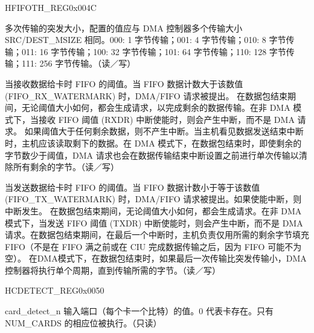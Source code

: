 \begin{register}{H}{FIFOTH\_REG}{0x004C}\label{regdesc:FIFOTHREG}
%
%
%
%
%
%
\regnewline%
\begin{regdesc}\begin{reglist}
\item [DMA\_MULTIPLE\_TRANSACTION\_SIZE]多次传输的突发大小，配置的值应与 DMA 控制器多个传输大小 SRC/DEST\_MSIZE 相同。000: 1 字节传输；001: 4 字节传输；010: 8 字节传输；011: 16 字节传输；100: 32 字节传输；101: 64 字节传输；110: 128 字节传输；111: 256 字节传输。（读／写）
\item [RX\_WMARK]当接收数据给卡时 FIFO 的阈值。当 FIFO 数据计数大于该数值 (FIFO\_RX\_WATERMARK) 时，DMA/FIFO 请求被提出。 在数据包结束期间，无论阈值大小如何，都会生成请求，以完成剩余的数据传输。在非 DMA 模式下，当接收 FIFO 阈值 (RXDR) 中断使能时，则会产生中断，而不是 DMA 请求。 如果阈值大于任何剩余数据，则不产生中断。当主机看见数据发送结束中断时，主机应该读取剩下的数据。在 DMA 模式下，在数据包结束时，即使剩余的字节数少于阈值，DMA  请求也会在数据传输结束中断设置之前进行单次传输以清除所有剩余的字节。（读／写）
\item [TX\_WMARK]当发送数据给卡时 FIFO 的阈值。当 FIFO 数据计数小于等于该数值 (FIFO\_TX\_WATERMARK) 时，DMA/FIFO 请求被提出。如果使能中断，则中断发生。 在数据包结束期间，无论阈值大小如何，都会生成请求。在非 DMA 模式下，当发送 FIFO 阈值 (TXDR) 中断使能时，则会产生中断，而不是 DMA 请求。在数据包结束期间，在最后一个中断时，主机负责仅用所需的剩余字节填充 FIFO（不是在 FIFO 满之前或在 CIU 完成数据传输之后，因为 FIFO 可能不为空）。 在DMA模式下，在数据包结束时，如果最后一次传输比突发传输小，DMA 控制器将执行单个周期，直到传输所需的字节。（读／写）
\end{reglist}\end{regdesc}
\end{register}


\begin{register}{H}{CDETECT\_REG}{0x0050}\label{regdesc:CDETECTREG}
%
%
\regnewline%
\begin{regdesc}\begin{reglist}
\item [CARD\_DETECT\_N] card\_detect\_n 输入端口（每个卡一个比特）的值。0 代表卡存在。只有 NUM\_CARDS 的相应位被执行。（只读）
\end{reglist}\end{regdesc}
\end{register}


